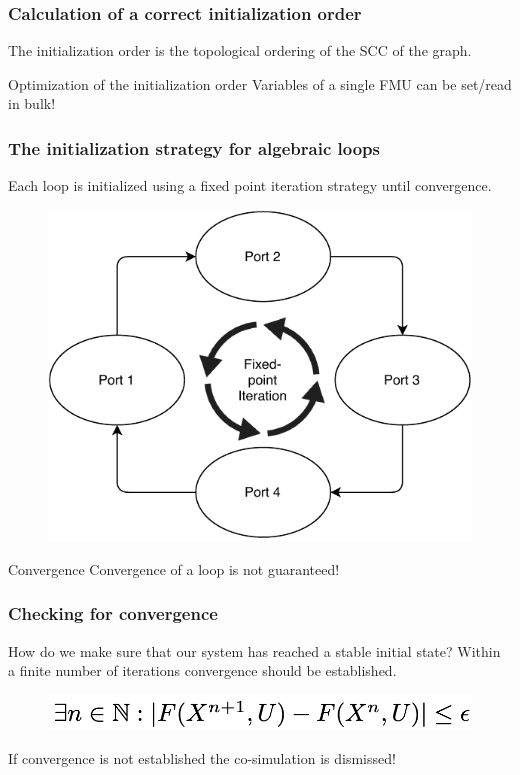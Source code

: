 \documentclass{beamer}
\begin{document}
\begin{frame}
\frametitle{Calculation of a correct initialization order}
The initialization order is the topological ordering of the SCC of the graph.

\begin{exampleblock}{Optimization of the initialization order}
Variables of a single FMU can be set/read in bulk!
\end{exampleblock}
\end{frame}

\begin{frame}
\frametitle{The initialization strategy for algebraic loops}
    Each loop is initialized using a fixed point iteration strategy until convergence.
    
\begin{figure}
    \centering
    \includegraphics[scale=0.6]{images/ExpansionPlugin-Page-4.pdf}
\end{figure}
    
\begin{alertblock}{Convergence}
    Convergence of a loop is not guaranteed!
\end{alertblock}
    
\end{frame}

\begin{frame}
\frametitle{Checking for convergence}
How do we make sure that our system has reached a stable initial state?
Within a finite number of iterations convergence should  be established.
\begin{figure}
    \centering
    \includegraphics[scale=0.3]{images/Screenshot 2020-09-09 at 20.51.28.png}
\end{figure}

If convergence is not established the co-simulation is dismissed!
\end{frame}
\end{document}
